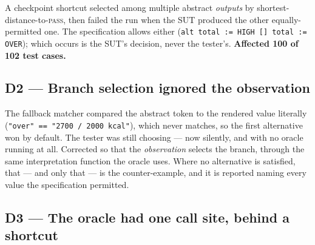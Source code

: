 \documentclass[11pt,a4paper]{article}
\newcommand{\dref}[1]{\textbf{D#1}}
\begin{document}
A checkpoint shortcut selected among multiple abstract \emph{outputs} by
shortest-distance-to-\textsc{pass}, then failed the run when the SUT produced the
other equally-permitted one. The specification allows either
(\texttt{alt total := HIGH [] total := OVER}); which occurs is the SUT's decision,
never the tester's. \textbf{Affected 100 of 102 test cases.}

\subsection*{\dref{2} --- Branch selection ignored the observation}

The fallback matcher compared the abstract token to the rendered value literally
(\texttt{"over" == "2700 / 2000 kcal"}), which never matches, so the first
alternative won by default. The tester was still choosing --- now silently, and
with no oracle running at all. Corrected so that the \emph{observation} selects the
branch, through the same interpretation function the oracle uses. Where no
alternative is satisfied, that --- and only that --- is the counter-example, and it
is reported naming every value the specification permitted.

\subsection*{\dref{3} --- The oracle had one call site, behind a shortcut}
\end{document}
